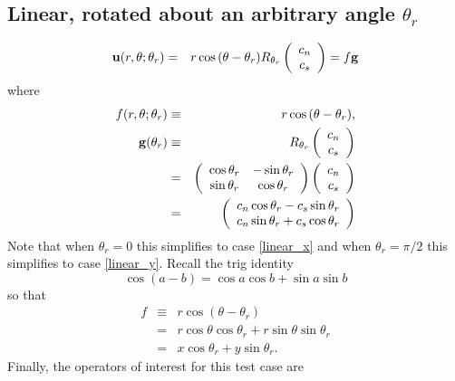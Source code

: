\documentclass[11pt]{report}
\begin{document}
\subsection{Linear, rotated about an arbitrary angle $\theta_r$\label{linear_rotation}}
\begin{eqnarray}
{\bf u}(r,\theta;\theta_r) &=& r\cos{(\theta-\theta_r)} R_{\theta_r} \left( \begin{array}{c} c_n \\ c_s \end{array}   \right) = f{\bf g}
\end{eqnarray}
where 
\begin{eqnarray}
\label{def f}
f(r,\theta;\theta_r)&\equiv& r\cos{(\theta-\theta_r)},\\
\label{def g}
{\bf g}(\theta_r) &\equiv& R_{\theta_r} \left( \begin{array}{c} c_n \\ c_s \end{array}   \right) \\
&=& \left(\begin{array}{cc} \cos{\theta_r}& -\sin{\theta_r} \\
                          \sin{\theta_r}&  \cos{\theta_r}   \end{array}\right)
 \left( \begin{array}{c} c_n \\ c_s \end{array}   \right)\\
&=& \left(\begin{array}{c} c_n\cos{\theta_r} -c_s\sin{\theta_r} \\
                          c_n\sin{\theta_r} +  c_s \cos{\theta_r}   \end{array}\right)
\end{eqnarray}
Note that when $\theta_r=0$ this simplifies to case \ref{linear_x} and when $\theta_r=\pi/2$ this simplifies to case \ref{linear_y}.  Recall the trig identity
\begin{equation}
\cos{(a-b)} = \cos{a}\cos{b} + \sin{a}\sin{b}
\end{equation}
so that 
\begin{eqnarray}
f&\equiv& r\cos{(\theta-\theta_r)}\\
 &=& r\cos{\theta}\cos{\theta_r} + r\sin{\theta}\sin{\theta_r}\\
 &=& x\cos{\theta_r} + y\sin{\theta_r}.
\end{eqnarray}
Finally, the operators of interest for this test case are
\end{document}
